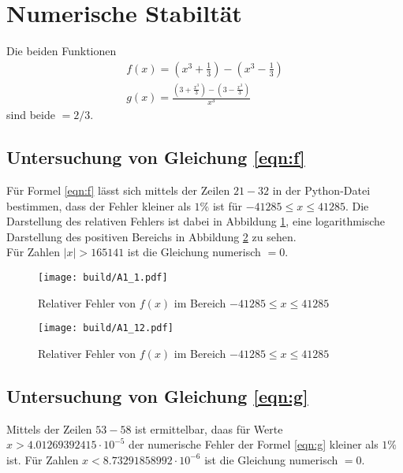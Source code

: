 



\section{Numerische Stabiltät}
Die beiden Funktionen
\begin{gather}
  f(x)=\left(x^3+\frac{1}{3}\right)-\left(x^3-\frac{1}{3}\right)\label{eqn:f}\\
  g(x)=\frac{\left(3+\frac{x^3}{3}\right)-\left(3-\frac{x^3}{3}\right)}{x^3}\label{eqn:g}
\end{gather}
sind beide $=2/3$.

\subsection{Untersuchung von Gleichung \eqref{eqn:f}}
\noindent Für Formel \eqref{eqn:f} lässt sich mittels der Zeilen $21-32$ in der Python-Datei bestimmen, dass der Fehler kleiner als $1\%$ ist für $-41285 \leq x \leq 41285$. Die Darstellung des relativen Fehlers ist dabei in Abbildung \ref{fig:FehlerF}, eine logarithmische Darstellung des positiven Bereichs in Abbildung \ref{fig:FehlerFlog} zu sehen.\\
Für Zahlen $|x|>165141$ ist die Gleichung numerisch $=0$.

\begin{figure}
  \centering
  \texttt{[image: build/A1\_1.pdf]}
  \caption{Relativer Fehler von $f(x)$ im Bereich $-41285 \leq x \leq 41285$}
  \label{fig:FehlerF}
\end{figure}

\begin{figure}
  \centering
  \texttt{[image: build/A1\_12.pdf]}
  \caption{Relativer Fehler von $f(x)$ im Bereich $-41285 \leq x \leq 41285$}
  \label{fig:FehlerFlog}
\end{figure}

\newpage

\subsection{Untersuchung von Gleichung \eqref{eqn:g}}
\noindent Mittels der Zeilen $53-58$ ist ermittelbar, daas für Werte $x>4.01269392415 \cdot 10^{-5}$ der numerische Fehler der Formel \eqref{eqn:g} kleiner als $1\%$ ist.
Für Zahlen $x<8.73291858992 \cdot 10^{-6}$ ist die Gleichung numerisch $=0$.

